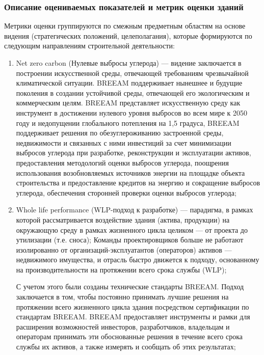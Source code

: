 \subsubsection*{Описание оцениваемых показателей и метрик оценки зданий}
Метрики оценки группируются по смежным предметным областям на основе видения (стратегических положений, целеполагания), которые формируются по следующим направлениям строительной деятельности:
\begin{enumerate}[1)]
    \item Net zero carbon (Нулевые выбросы углерода) --- видение заключается в построении искусственной среды, отвечающей требованиям чрезвычайной климатической ситуации.
        BREEAM поддерживает нынешнее и будущие поколения в создании устойчивой среды, отвечающей его экологическим и коммерческим целям.
        BREEAM представляет искусственную среду как инструмент в достижении нулевого уровня выбросов во всем мире к 2050 году и недопущении глобального потепления на 1,5 градуса,
        BREEAM поддерживает решения по обезуглероживанию застроенной среды, недвижимости и связанных с ними инвестиций за счет 
        минимизации выбросов углерода при разработке, реконструкции и эксплуатации активов, предоставления методологий оценки выбросов углерода,
        поощрения использования возобновляемых источников энергии на площадке объекта строительства и предоставление кредитов на энергию и сокращение выбросов углерода,
        обеспечения сторонней проверки оценки выбросов углерода;
    \item Whole life performance (WLP-подход к разработке) --- парадигма, в рамках которой рассматривается воздействие здания (актива, продукции) на окружающую среду в рамках жизненного цикла целиком ---
        от проекта до утилизации (т.е. сноса);
        Команды проектировщиков больше не работают изолированно от организаций-эксплуатантов (операторов) активов --- недвижимого имущества, и отрасль быстро движется к подходу,
        основанному на производительности на протяжении всего срока службы (WLP);
    
        С учетом этого были созданы технические стандарты BREEAM. Подход заключается в том, чтобы постоянно принимать лучшие решения
        на протяжении всего жизненного цикла здания посредством сертификации по стандартам BREEAM.
        BREEAM предоставляет инструменты и рамки для расширения возможностей инвесторов, разработчиков,
        владельцам и операторам принимать эти обоснованные решения в течение всего срока службы их активов, а также измерять и сообщать об этих результатах;
        

\end{enumerate}
